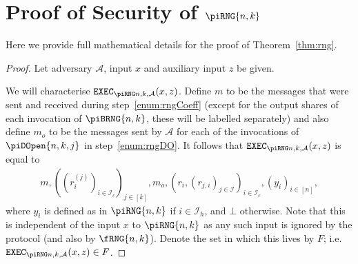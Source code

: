 \documentclass{article}
\newcommand{\seq}[1]{\left[#1\right]}
\theoremstyle{remark}
\begin{document}
\section{Proof of Security of $\piRNG{n,k}$}\label{app:rng}

Here we provide full mathematical details for the proof of
Theorem~\ref{thm:rng}.

\begin{proof}
	\newcommand{\proto}{\piRNG{n,k}}

	Let adversary $\mathcal{A}$, input $x$ and auxiliary input $z$ be given.

	We will characterise $\execD$. Define $m$ to be the messages that were sent
	and received during step~\ref{enum:rngCoeff} (except for the output shares
	of each invocation of $\piBRNG{n,k}$, these will be labelled separately)
	and also define $m_o$ to be the messages sent by $\mathcal{A}$ for each of
	the invocations of $\piDOpen{n,k,j}$ in step~\ref{enum:rngDO}. It follows
	that $\execD$ is equal to
	\begin{align*}
		m,
		{\left(
			{\left(r_i^{(j)}\right)}_{i \in \mathcal{I}_c}
		\right)}_{j \in \seq{k}},
		m_o,
		{\left(
			r_i, {(r_{j,i})}_{j \in \mathcal{I}}
		\right)}_{i \in \mathcal{I}_c},
		{(y_i)}_{i \in \seq{n}},
	\end{align*}
	where $y_i$ is defined as in $\piRNG{n,k}$ if $i \in \mathcal{I}_h$, and
	$\bot$ otherwise. Note that this is independent of the input $x$ to
	$\piRNG{n,k}$ as any such input is ignored by the protocol (and also by
	$\fRNG{n,k}$). Denote the set in which this lives by $F$; i.e. $\execD \in
	F$.


\end{proof}
\end{document}
